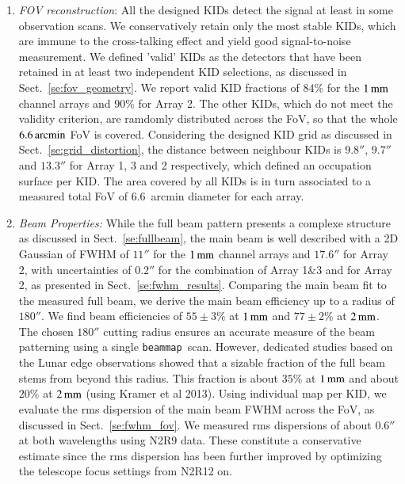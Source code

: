 \documentclass{aa}
\newcommand{\bm}{{\tt beammap}}
\begin{document}
\begin{enumerate}
\item \emph{FOV reconstruction}: All the designed KIDs detect the signal at least in some observation
  scans. We conservatively retain only the most stable KIDs, which are
  immune to the cross-talking effect and yield good signal-to-noise
  measurement. We defined 'valid' KIDs as the detectors that have been
  retained in at least two independent KID selections, as discussed in
  Sect.~\ref{se:fov_geometry}. We report valid KID fractions of $84\%$
  for the $1\,\rm{mm}$ channel arrays and $90\%$ for Array 2. The other
  KIDs, which do not meet the validity criterion, are ramdomly
  distributed across the FoV, so that the whole $6.6\,\rm{arcmin}$ FoV is
  covered. Considering the designed KID grid as discussed in
  Sect.~\ref{se:grid_distortion}, the distance between
  neighbour KIDs is $9.8''$, $9.7''$ and $13.3''$ for Array 1, 3 and 2
  respectively, which defined an occupation surface per KID. The area
  covered by all KIDs is in turn associated to a measured total FoV of
  $6.6$~arcmin diameter for each array.
  
\item \emph{Beam Properties:} While the full beam pattern presents a complexe structure as discussed
  in Sect.~\ref{se:fullbeam}, the main beam is well described with a 2D
  Gaussian of FWHM of $11''$ for the $1\,\rm{mm}$ channel arrays
  and $17.6''$ for Array 2, with uncertainties of  $0.2''$ for the
  combination of Array 1$\&$3 and for Array 2, as presented in
  Sect.~\ref{se:fwhm_results}.
  Comparing the main beam fit to the measured full beam, we derive the
  main beam efficiency up to a radius of $180''$. We find beam
  efficiencies of $55 \pm 3 \%$ at $1\,\rm{mm}$ and $77 \pm 2 \%$ at
  $2\,\rm{mm}$. %
  The chosen $180''$ cutting radius ensures an accurate
  measure of the beam patterning using a single \bm\ scan. However,
  dedicated studies based on the Lunar edge observations showed that
  a sizable fraction of the full beam stems from beyond this
  radius. This fraction is about $35\%$ at $1\,\rm{mm}$ and about $20\%$
  at $2\,\rm{mm}$ (using Kramer et al 2013). Using individual map per
  KID, we evaluate the rms dispersion of the main beam FWHM across the
  FoV, as discussed in Sect.~\ref{se:fwhm_fov}. We measured rms
  dispersions of about $0.6''$ at both wavelengths using N2R9 data. These
  constitute a conservative estimate since the rms dispersion has been
  further improved by optimizing the telescope focus settings from N2R12
  on.  


\end{enumerate}
\end{document}
